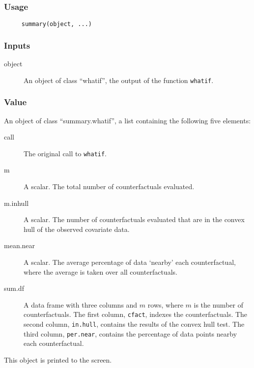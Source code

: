 \documentclass[oneside,letterpaper,titlepage]{article}
\begin{document}
\subsubsection{Usage}

\begin{verbatim}
     summary(object, ...)
\end{verbatim}

\subsubsection{Inputs}

\begin{description}
  \item[object]  An object of class ``whatif'', the output of 
    the function \texttt{whatif}.
\end{description}

\subsubsection{Value}

An object of class ``summary.whatif'', a list containing the following five
elements:
\begin{description}
\item[call]  The original call to \texttt{whatif}.
\item[m] A scalar.  The total number of counterfactuals evaluated.
\item[m.inhull] A scalar.  The number of counterfactuals evaluated
  that are in the convex hull of the observed covariate data.
\item[mean.near] A scalar.  The average percentage of data `nearby'
  each counterfactual, where the average is taken over all
  counterfactuals.
\item[sum.df] A data frame with three columns and $m$ rows, where $m$ is
  the number of counterfactuals.  The first column, \texttt{cfact}, indexes
  the counterfactuals.  The second column, \texttt{in.hull}, contains the
  results of the convex hull test.  The third column, \texttt{per.near},
  contains the percentage of data points nearby each counterfactual.
\end{description}
This object is printed to the screen.


\bibsep=0in

\end{document}
